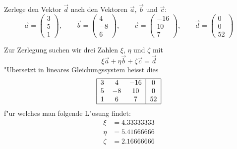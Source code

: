 Zerlege den Vektor $\vec d$ nach den Vektoren $\vec a$, $\vec b$ und $\vec c$:
\[
\vec a=\begin{pmatrix}3\\5\\1\end{pmatrix},\qquad
\vec b=\begin{pmatrix}4\\-8\\6\end{pmatrix},\qquad
\vec c=\begin{pmatrix}-16\\10\\7\end{pmatrix},\qquad
\vec d=\begin{pmatrix}0\\0\\52\end{pmatrix}
\]

\begin{loesung}
Zur Zerlegung suchen wir drei Zahlen $\xi$, $\eta$ und $\zeta$ mit
\[
\xi \vec a
+
\eta \vec b
+
\zeta \vec c
=
\vec d
\]
"Ubersetzt in lineares Gleichungssystem heisst dies
\[
\begin{tabular}{|ccc|c|}
\hline
3&4&$-16$&0\\
5&$-8$&10&0\\
1&6&7&52\\
\hline
\end{tabular}
\]
f"ur welches man folgende L"osung findet:
\begin{align*}
\xi&=4.33333333\\
\eta&=5.41666666\\
\zeta&=2.16666666
\end{align*}
\end{loesung}


